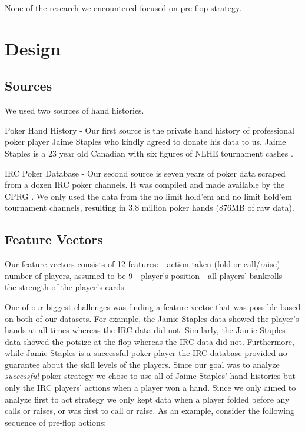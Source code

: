 \documentclass[twoside]{article}
\begin{document}
\begin{multicols}{2}
None of the research we encountered focused on pre-flop strategy. 


\section{Design}

\subsection{Sources}
We used two sources of hand histories.
\begin{compactitem}
\item{Poker Hand History} - Our first source is the private hand history of professional poker player Jaime Staples who kindly agreed to donate his data to us. Jaime Staples is a 23 year old Canadian with six figures of NLHE tournament cashes \cite{JaimeStaples}.
\item{IRC Poker Database} - Our second source is seven years of poker data scraped from a dozen IRC poker channels. It was compiled and made available by the CPRG \cite{IRCDatabase}. 
We only used the data from the no limit hold'em and  no limit hold'em tournament channels, resulting in 3.8 million poker hands (876MB of raw data). 
\end{compactitem}

\subsection{Feature Vectors}
Our feature vectors consists of 12 features: \newline
\indent - action taken (fold or call/raise) \newline
\indent - number of players, assumed to be 9\newline
\indent - player's position\newline
\indent - all players' bankrolls\newline
\indent - the strength of the player's cards\newline

One of our biggest challenges was finding a feature vector that was possible based on both of our datasets. For example, the Jamie Staples data showed the player's hands at all times whereas the IRC data did not. Similarly, the Jamie Staples data showed the potsize at the flop whereas the IRC data did not.  
Furthermore, while Jamie Staples is a successful poker player \cite{JaimeStaples} the IRC database provided no guarantee about the skill levels of the players. Since our goal was to analyze \textit{successful} poker strategy we chose to use all of Jaime Staples' hand histories but only the IRC players' actions when a player won a hand. Since we only aimed to analyze first to act strategy we only kept data when a player folded before any calls or raises, or was first to call or raise. As an example, consider the following sequence of pre-flop actions: 


\end{multicols}
\end{document}
